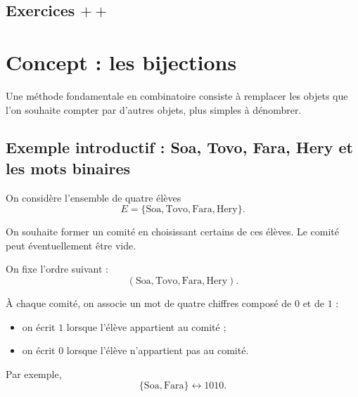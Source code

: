 \documentclass[11pt]{article}
\begin{document}
\subsection*{Exercices \texorpdfstring{$++$}{++}}


\section{Concept : les bijections}\label{sec:bijections}

Une méthode fondamentale en combinatoire consiste à remplacer les objets
que l'on souhaite compter par d'autres objets, plus simples à dénombrer.

\subsection{Exemple introductif : Soa, Tovo, Fara, Hery et les mots binaires}\label{sec:exemple-mots-binaires}

On considère l'ensemble de quatre élèves
\[
E=\{\text{Soa},\text{Tovo},\text{Fara},\text{Hery}\}.
\]

On souhaite former un comité en choisissant certains de ces élèves.
Le comité peut éventuellement être vide.

On fixe l'ordre suivant :
\[
(\text{Soa},\text{Tovo},\text{Fara},\text{Hery}).
\]

À chaque comité, on associe un mot de quatre chiffres composé de \(0\) et de
\(1\) :

\begin{itemize}
    \item on écrit \(1\) lorsque l'élève appartient au comité ;
    \item on écrit \(0\) lorsque l'élève n'appartient pas au comité.
\end{itemize}

Par exemple,
\[
\{\text{Soa},\text{Fara}\}
\longleftrightarrow
1010.
\]

\begin{center}
\end{center}
\end{document}

